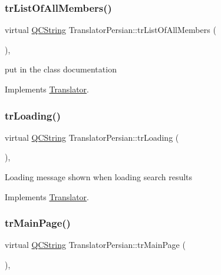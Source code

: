 \subsubsection{\texorpdfstring{trListOfAllMembers()}{trListOfAllMembers()}}
{\footnotesize\ttfamily virtual \mbox{\hyperlink{class_q_c_string}{Q\+C\+String}} Translator\+Persian\+::tr\+List\+Of\+All\+Members (\begin{DoxyParamCaption}{ }\end{DoxyParamCaption})\hspace{0.3cm}{\ttfamily [inline]}, {\ttfamily [virtual]}}

put in the class documentation 

Implements \mbox{\hyperlink{class_translator}{Translator}}.

\mbox{\label{class_translator_persian_a24ef149e27d80177e7eca6afefa440eb}} 
\subsubsection{\texorpdfstring{trLoading()}{trLoading()}}
{\footnotesize\ttfamily virtual \mbox{\hyperlink{class_q_c_string}{Q\+C\+String}} Translator\+Persian\+::tr\+Loading (\begin{DoxyParamCaption}{ }\end{DoxyParamCaption})\hspace{0.3cm}{\ttfamily [inline]}, {\ttfamily [virtual]}}

Loading message shown when loading search results 

Implements \mbox{\hyperlink{class_translator}{Translator}}.

\mbox{\label{class_translator_persian_ac338f79be2c8e48f92360ea8c4c649d9}} 
\subsubsection{\texorpdfstring{trMainPage()}{trMainPage()}}
{\footnotesize\ttfamily virtual \mbox{\hyperlink{class_q_c_string}{Q\+C\+String}} Translator\+Persian\+::tr\+Main\+Page (\begin{DoxyParamCaption}{ }\end{DoxyParamCaption})\hspace{0.3cm}{\ttfamily [inline]}, {\ttfamily [virtual]}}

